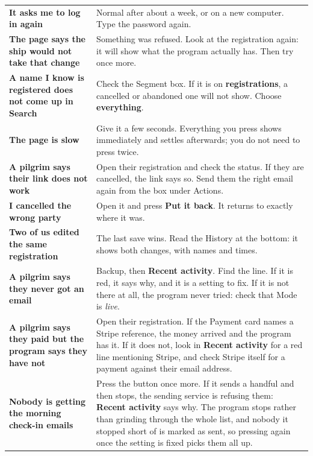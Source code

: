 \documentclass[12pt]{article}
\newcommand{\btn}[1]{\textbf{#1}}
\begin{document}
\begin{tabularx}{\linewidth}{@{}L{1.95in}Y@{}}
\toprule
\textbf{It asks me to log in again} & Normal after about a week, or on a
new computer. Type the password again. \\[7pt]
\textbf{The page says the ship would not take that change} & Something
was refused. Look at the registration again: it will show what the
program actually has. Then try once more. \\[7pt]
\textbf{A name I know is registered does not come up in Search} & Check
the Segment box. If it is on \btn{registrations}, a cancelled or
abandoned one will not show. Choose \btn{everything}. \\[7pt]
\textbf{The page is slow} & Give it a few seconds. Everything you press
shows immediately and settles afterwards; you do not need to press
twice. \\[7pt]
\textbf{A pilgrim says their link does not work} & Open their
registration and check the status. If they are cancelled, the link says
so. Send them the right email again from the box under Actions. \\[7pt]
\textbf{I cancelled the wrong party} & Open it and press \btn{Put it
back}. It returns to exactly where it was. \\[7pt]
\textbf{Two of us edited the same registration} & The last save wins.
Read the History at the bottom: it shows both changes, with names and
times. \\[7pt]
\textbf{A pilgrim says they never got an email} & Backup, then
\btn{Recent activity}. Find the line. If it is red, it says why, and it
is a setting to fix. If it is not there at all, the program never tried:
check that Mode is \textit{live}. \\[7pt]
\textbf{A pilgrim says they paid but the program says they have not} &
Open their registration. If the Payment card names a Stripe reference,
the money arrived and the program has it. If it does not, look in
\btn{Recent activity} for a red line mentioning Stripe, and check Stripe
itself for a payment against their email address. \\[7pt]
\textbf{Nobody is getting the morning check-in emails} & Press the
button once more. If it sends a handful and then stops, the sending
service is refusing them: \btn{Recent activity} says why. The program
stops rather than grinding through the whole list, and nobody it stopped
short of is marked as sent, so pressing again once the setting is fixed
picks them all up. \\
\bottomrule
\end{tabularx}
\end{document}
